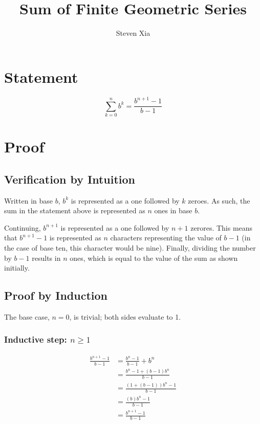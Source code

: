 \documentclass{article}
\title{Sum of Finite Geometric Series}
\author{Steven Xia}
\begin{document}
\maketitle

\section{Statement}
$$\sum_{k=0}^n b^k = \frac{b^{n+1} - 1}{b - 1}$$

\section{Proof}

\subsection{Verification by Intuition}
Written in base $b$, $b^k$ is represented as a one followed by $k$ zeroes.
As such, the sum in the statement above is represented as $n$ ones in base $b$.

Continuing, $b^{n+1}$ is represented as a one followed by $n+1$ zerores.
This means that $b^{n+1} - 1$ is represented as $n$ characters representing the value of $b - 1$ (in the case of base ten, this character would be nine).
Finally, dividing the number by $b-1$ results in $n$ ones, which is equal to the value of the sum as shown initially.

\subsection{Proof by Induction}

The base case, $n=0$, is trivial; both sides evaluate to 1.

\subsubsection{Inductive step: $n\geq1$}
\begin{align}
    \frac{b^{n+1} - 1}{b - 1} &= \frac{b^n - 1}{b - 1} + b^n \\
                              &= \frac{b^n - 1 + (b - 1)b^n}{b - 1} \\
                              &= \frac{(1 + (b - 1))b^n - 1}{b - 1} \\
                              &= \frac{(b)b^n - 1}{b - 1} \\
                              &= \frac{b^{n+1} - 1}{b - 1}
\end{align}
\end{document}
